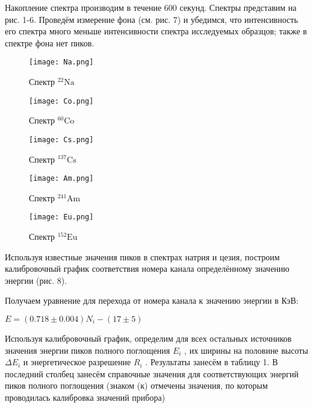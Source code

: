 Накопление спектра производим в течение 600 секунд. Спектры представим на рис.
1-6. Проведём измерение фона (см. рис. 7) и убедимся, что интенсивность его
спектра много меньше интенсивности спектра исследуемых образцов; также в спектре
фона нет пиков.

\begin{figure}
\begin{center}
  \texttt{[image: Na.png]}
  \caption{Спектр ${}^{22}{\text{Na}}$}
  \texttt{[image: Co.png]}
  \caption{Спектр ${}^{60}{\text{Co}}$}
\end{center}
\end{figure}

\begin{figure}
\begin{center}
  \texttt{[image: Cs.png]}
  \caption{Спектр ${}^{137}{\text{Cs}}$}
  \texttt{[image: Am.png]}
  \caption{Спектр ${}^{241}{\text{Am}}$}
\end{center}
\end{figure}

\begin{figure}
\begin{center}
  \texttt{[image: Eu.png]}
  \caption{Спектр ${}^{152}{\text{Eu}}$}
\end{center}
\end{figure}

Используя известные значения пиков в спектрах натрия и цезия, построим
калибровочный график соответствия номера канала определённому значению энергии
(рис. 8).

Получаем уравнение для перехода от номера канала к значению энергии в КэВ:
\begin{center}
    $E = (0.718 \pm 0.004)N_i - (17 \pm 5)$
\end{center}

Используя калибровочный график, определим для всех остальных источников значения
энергии пиков полного поглощения $E_i$ , их ширины на половине высоты $\Delta
E_i$ и энергетическое разрешение $R_i$ . Результаты занесём в таблицу 1. В
последний столбец занесём справочные значения для соответствующих энергий пиков
полного поглощения (знаком (к) отмечены значения, по которым проводилась
калибровка значений прибора)

